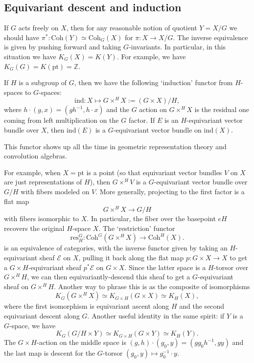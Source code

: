 \documentclass[11pt]{amsart}
\theoremstyle{definition}
\newcommand{\Ec}{\mathcal{E}}
\newcommand{\Coh}{\mathrm{Coh}}
\numberwithin{equation}{subsection}
\numberwithin{figure}{subsection}
\newcommand{\pt}{\mathrm{pt}}
\begin{document}
\subsection{Equivariant descent and induction}
If $G$ acts freely on $X$, then for any reasonable notion of quotient $Y=X/G$ we should have $\pi^*:\Coh(Y) \simeq \Coh_G(X)$ for $\pi:X\rightarrow X/G$. The inverse equivalence is given by pushing forward and taking $G$-invariants. In particular, in this situation we have $K_G(X)=K(Y)$.  For example, we have $K_G(G)=K(\pt)=\mathbb{Z}$.

 If $H$ is a subgroup of $G$, then we have the following `induction' functor from $H$-spaces to $G$-spaces:
$$
\mathrm{ind} \colon X \mapsto G\times^H X := (G\times X)/H, 
$$
where $h\cdot(g,x)= (gh^{-1},h\cdot x)$ and the $G$ action on $G\times^H X $ is the residual one coming from left multiplication on the $G$ factor. If $E$ is an $H$-equivariant vector bundle over $X$, then $\mathrm{ind}(E)$ is a $G$-equivariant vector bundle on $\mathrm{ind}(X)$.


This functor shows up all the time in geometric representation theory and convolution algebras. 

 For example, when $X=\pt$ is a point (so that equivariant vector bundles $V$ on $X$ are just representations of $H$), then $G\times^H V$ is a $G$-equivariant vector bundle over $G/H$ with fibers modeled on $V$. More generally, projecting to the first factor is a flat map 
$$
G\times^H X\rightarrow G/H
$$
with fibers isomorphic to $X$. In particular,  the fiber over the basepoint $eH$ recovers the original $H$-space $X$.  The `restriction' functor 
$$
\mathrm{res}^G_H\colon \Coh^G(G\times^H X)\rightarrow \Coh^H(X).
$$
is an equivalence of categories, with the inverse functor given by taking an $H$-equivariant sheaf $\Ec$ on $X$, pulling it back along the flat map $p:G\times X\rightarrow X$ to get a $G\times H$-equivariant sheaf $p^*\Ec$ on $G\times X$. Since the latter space is a $H$-torsor over $G\times^H H$, we can then equivariantly-descend this sheaf to get a $G$-equivariant sheaf on $G\times^H H$. Another way to phrase this is as the composite of isomorphisms
$$
K_G(G\times^H X) \simeq K_{G\times H}(G\times X)  \simeq K_{H}( X), 
$$
where the first isomorphism is equivariant ascent along $H$ and the second equivariant descent along $G$. Another useful identity in the same spirit: if $Y$ is a $G$-space, we have
$$
K_G(G/H\times Y)\simeq K_{G\times H}(G\times Y)\simeq K_{H}(Y).
$$
The $G\times H$-action on the middle space is $(g,h)\cdot (g_0,y) = (gg_0h^{-1},gy)$ and the last map is descent for the $G$-torsor $(g_0,y)\mapsto g_0^{-1}\cdot y$.
\end{document}
